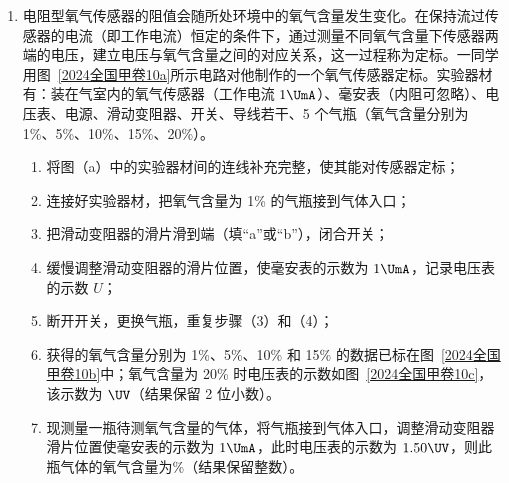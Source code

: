 \documentclass[\gkver]{gaokaozhenti}
\begin{document}
\begin{enumerate}
\item
电阻型氧气传感器的阻值会随所处环境中的氧气含量发生变化。在保持流过传感器的电流（即工作电流）恒定的条件下，通过测量不同氧气含量下传感器两端的电压，建立电压与氧气含量之间的对应关系，这一过程称为定标。一同学用图~\ref{2024全国甲卷10a}所示电路对他制作的一个氧气传感器定标。实验器材有：装在气室内的氧气传感器（工作电流 $1 \UmA$）、毫安表（内阻可忽略）、电压表、电源、滑动变阻器、开关、导线若干、5 个气瓶（氧气含量分别为 1\%、5\%、10\%、15\%、20\%）。
\begin{enumerate}
	\item
	将图（a）中的实验器材间的连线补充完整\tkanswer[2cm]{}，使其能对传感器定标；
	\item
	连接好实验器材，把氧气含量为 1\% 的气瓶接到气体入口；
	\item
	把滑动变阻器的滑片滑到端（填“a”或“b”），闭合开关；
	\item
	缓慢调整滑动变阻器的滑片位置，使毫安表的示数为 $1 \UmA$，记录电压表的示数 $U$；
	\item
	断开开关，更换气瓶，重复步骤（3）和（4）；
	\item
	获得的氧气含量分别为 1\%、5\%、10\% 和 15\% 的数据已标在图~\ref{2024全国甲卷10b}中；氧气含量为 20\% 时电压表的示数如图~\ref{2024全国甲卷10c}，该示数为 $\UV$（结果保留 2 位小数）。
	\item
	现测量一瓶待测氧气含量的气体，将气瓶接到气体入口，调整滑动变阻器滑片位置使毫安表的示数为 $1 \UmA$，此时电压表的示数为 $1.50 \UV$，则此瓶气体的氧气含量为\%（结果保留整数）。
\end{enumerate}


\end{enumerate}
\end{document}
